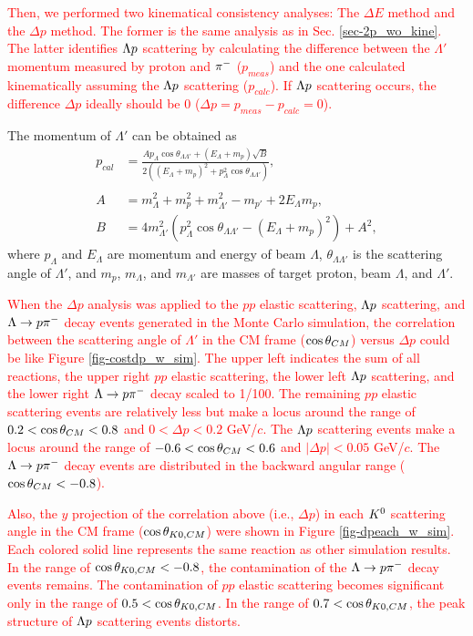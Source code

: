 \textcolor{red}{ Then, we performed two kinematical consistency analyses: The $\Delta E$ method and the $\Delta p$ method. The former is the same analysis as in Sec. \ref{sec-2p_wo_kine}. The latter identifies $\Lambda p$ scattering by calculating the difference between the $\Lambda'$ momentum measured by proton and $\pi^{-}$ ($p_{meas}$) and the one calculated kinematically assuming the $\Lambda p$ scattering ($p_{calc}$). If $\Lambda p$ scattering occurs, the difference $\Delta p$ ideally should be 0 ($\Delta p = p_{meas} - p_{calc} = 0$). }

The momentum of $\Lambda'$ can be obtained as
\begin{align}
  p_{cal} &= \frac{A p_{\Lambda} \cos{\theta_{\Lambda\Lambda'}} + (E_{\Lambda} + m_{p}) \sqrt{B}} {2 ((E_{\Lambda} + m_{p})^{2} + p_{\Lambda}^{2} \cos{\theta_{\Lambda\Lambda'}})}, \\
  \nonumber \\
  A &= m_{\Lambda}^{2} + m_{p}^{2} + m_{\Lambda'}^{2} - m_{p'} + 2 E_{\Lambda} m_{p}, \\
  B &= 4 m_{\Lambda'}^{2} (p_{\Lambda}^{2} \cos{\theta_{\Lambda\Lambda'}} - (E_{\Lambda} + m_{p})^{2}) + A^{2},
  \label{eq-dp_scatL}
\end{align}
where $p_{\Lambda}$ and $E_{\Lambda}$ are momentum and energy of beam $\Lambda$, $\theta_{\Lambda\Lambda'}$ is the scattering angle of $\Lambda'$, and $m_{p}$, $m_{\Lambda}$, and $m_{\Lambda'}$ are masses of target proton, beam $\Lambda$, and $\Lambda'$.

\textcolor{red}{ When the $\Delta p$ analysis was applied to the $pp$ elastic scattering, $\Lambda p$ scattering, and $\Lambda\to p\pi^{-}$ decay events generated in the Monte Carlo simulation, the correlation between the scattering angle of $\Lambda'$ in the CM frame ($\cos{\theta}_{CM}$) versus $\Delta p$ could be like Figure \ref{fig-costdp_w_sim}. 
The upper left indicates the sum of all reactions, the upper right $pp$ elastic scattering, the lower left $\Lambda p$ scattering, and the lower right $\Lambda\to p\pi^{-}$ decay scaled to 1/100.
The remaining $pp$ elastic scattering events are relatively less but make a locus around the range of $0.2<\cos{\theta}_{CM}<0.8$ and $0<\Delta p<0.2$ GeV/$c$. The $\Lambda p$ scattering events make a locus around the range of $-0.6<\cos{\theta}_{CM}<0.6$ and $|\Delta p|<0.05$ GeV/$c$. The $\Lambda\to p\pi^{-}$ decay events are distributed in the backward angular range ($\cos{\theta}_{CM}<-0.8$). }

\textcolor{red}{ Also, the $y$ projection of the correlation above (i.e., $\Delta p$) in each $K^{0}$ scattering angle in the CM frame ($\cos{\theta_{K0,CM}}$) were shown in Figure \ref{fig-dpeach_w_sim}. 
Each colored solid line represents the same reaction as other simulation results.
In the range of $\cos{\theta_{K0,CM}}<-0.8$, the contamination of the $\Lambda\to p\pi^{-}$ decay events remains. The contamination of $pp$ elastic scattering becomes significant only in the range of $0.5<\cos{\theta_{K0,CM}}$. In the range of $0.7<\cos{\theta_{K0,CM}}$, the peak structure of $\Lambda p$ scattering events distorts. }

